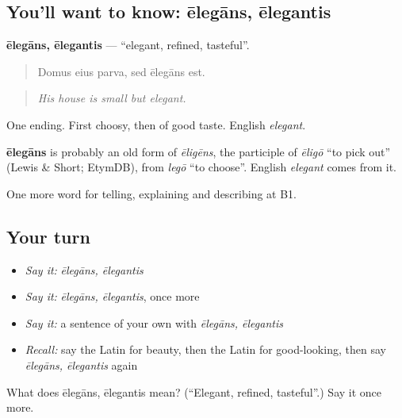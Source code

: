 \subsection*{You'll want to know: ēlegāns, ēlegantis}
\textbf{ēlegāns, ēlegantis} — \textquotedblleft{}elegant, refined, tasteful\textquotedblright{}.

\begin{quote}
Domus eius parva, sed ēlegāns est.
\end{quote}

\begin{quote}
\emph{His house is small but elegant.}
\end{quote}

One ending. First choosy, then of good taste. English \emph{elegant}.

\begin{cousinweb}
\textbf{ēlegāns} is probably an old form of \emph{ēligēns}, the participle of \emph{ēligō} \textquotedblleft{}to pick out\textquotedblright{} (Lewis \& Short; EtymDB), from \emph{legō} \textquotedblleft{}to choose\textquotedblright{}. English \emph{elegant} comes from it.
\end{cousinweb}

\begin{grammarlens}[title={What you've built}]
One more word for telling, explaining and describing at B1.
\end{grammarlens}

\subsection*{Your turn}
\begin{itemize}
\raggedright
  \item \emph{Say it:} \emph{ēlegāns, ēlegantis}
  \item \emph{Say it:} \emph{ēlegāns, ēlegantis}, once more
  \item \emph{Say it:} a sentence of your own with \emph{ēlegāns, ēlegantis}
  \item \emph{Recall:} say the Latin for beauty, then the Latin for good-looking, then say \emph{ēlegāns, ēlegantis} again
\end{itemize}

\begin{tcolorbox}[breakable,colback=teal!4,colframe=teal!35!black,title={Before you move on}]
What does ēlegāns, ēlegantis mean? (\textquotedblleft{}Elegant, refined, tasteful\textquotedblright{}.) Say it once more.
\end{tcolorbox}
